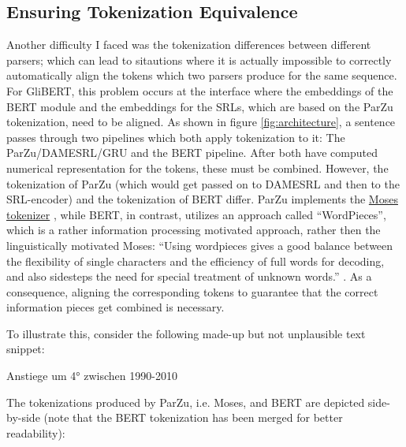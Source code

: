 \subsection{Ensuring Tokenization Equivalence}

Another difficulty I faced was the tokenization differences between different parsers; which can
lead to sitautions where it is actually impossible to correctly automatically align the tokens
which two parsers produce for the same sequence.
For GliBERT, this problem occurs at the interface where the embeddings of the BERT
module and the embeddings for the SRLs, which are based on the ParZu tokenization,
need to be aligned. As shown in figure \ref{fig:architecture}, a sentence passes
through two pipelines which both apply tokenization to it: The ParZu/DAMESRL/GRU
and the BERT pipeline. After both have computed numerical representation for the
tokens, these must be combined. However, the tokenization of ParZu (which would
get passed on to DAMESRL and then to the SRL-encoder) and the tokenization of BERT
differ. ParZu implements the \href{http://www.statmt.org/moses/}{Moses tokenizer}
\citep{koehn2007moses}, while BERT, in contrast, utilizes an approach called
``WordPieces'', which is a rather information processing motivated approach,
rather then the linguistically motivated Moses: ``Using wordpieces gives a good
balance between the flexibility of single characters and the efficiency of full
words for decoding, and also sidesteps the need for special treatment of unknown
words.'' \citep[p.~2]{wu2016google}. As a consequence, aligning the corresponding
tokens to guarantee that the correct information pieces get combined is necessary.

To illustrate this, consider the following made-up but not unplausible text snippet:

\begin{examples}
	\item \label{itm:tok-sentence} Anstiege um 4° zwischen 1990-2010
\end{examples}

The tokenizations produced by ParZu, i.e. Moses, and BERT are
depicted side-by-side (note that the BERT tokenization has been
merged for better readability):

